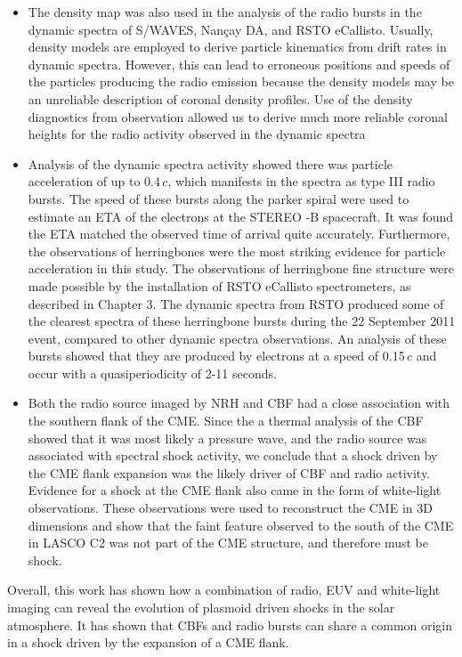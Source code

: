 \begin{itemize}
\item The density map was also used in the analysis of the radio bursts in the dynamic spectra of S/WAVES, Nan\c{c}ay DA, and RSTO eCallisto. Usually, density models are employed to derive particle kinematics from drift rates in dynamic spectra. However, this can lead to erroneous positions and speeds of the particles producing the radio emission because the density models may be an unreliable description of coronal density profiles. Use of the density diagnostics from observation allowed us to derive much more reliable coronal heights for the radio activity observed in the dynamic spectra
\item Analysis of the dynamic spectra activity showed there was particle acceleration of up to 0.4\,$c$, which manifests in the spectra as type III radio bursts. The speed of these bursts along the parker spiral were used to estimate an ETA of the electrons at the STEREO -B spacecraft. It was found the ETA matched the observed time of arrival quite accurately. Furthermore, the observations of herringbones were the most striking evidence for particle acceleration in this study. The observations of herringbone fine structure were made possible by the installation of RSTO eCallisto spectrometers, as described in Chapter 3. The dynamic spectra from RSTO produced some of the clearest spectra of these herringbone bursts during the 22 September 2011 event, compared to other dynamic spectra observations. An analysis of these bursts showed that they are produced by electrons at a speed of 0.15\,$c$ and occur with a quasiperiodicity of 2-11 seconds.
\item Both the radio source imaged by NRH and CBF had a close association with the southern flank of the CME. Since the a thermal analysis of the CBF showed that it was most likely a pressure wave, and the radio source was associated with spectral shock activity, we conclude that a shock driven by the CME flank expansion was the likely driver of CBF and radio activity. Evidence for a shock at the CME flank also came in the form of white-light observations. These observations were used to reconstruct the CME in 3D dimensions and show that the faint feature observed to the south of the CME in LASCO C2 was not part of the CME structure, and therefore must be shock.
\end{itemize}
Overall, this work has shown how a combination of radio, EUV and white-light imaging can reveal the evolution of plasmoid driven shocks in the solar atmosphere. It has shown that CBFs and radio bursts can share a common origin in a shock driven by the expansion of a CME flank.

